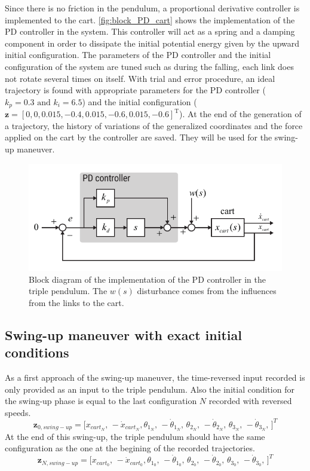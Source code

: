 \documentclass[a4paper,12pt]{article}
\begin{document}
Since there is no friction in the pendulum, a proportional derivative controller is implemented to the cart. \autoref{fig:block_PD_cart} shows the implementation of the PD controller in the system. This controller will act as a spring and a damping component in order to dissipate the initial potential energy given by the upward initial configuration. The parameters of the PD controller and the initial configuration of the system are tuned such as during the falling, each link does not rotate several times on itself. With trial and error procedure, an ideal trajectory is found with appropriate parameters for the PD controller ($k_p=\num{0.3}\text{ and } k_i=\num{6.5}$) and the initial configuration ($\mathbf{z} = [0,0,0.015,\num{-0.4},0.015,\num{-0.6},0.015,\num{-0.6}]^\text{T}$). At the end of the generation of a trajectory, the history of variations of the generalized coordinates and the force applied on the cart by the controller are saved. They will be used for the swing-up maneuver.
\begin{figure}[ht]
	\centering
	\includegraphics[width=15cm]{illustrations/block_PD_cart.pdf}
	\caption{Block diagram of the implementation of the PD controller in the triple pendulum. The $w(s)$ disturbance comes from the influences from the links to the cart.}
	\label{fig:block_PD_cart}
\end{figure}

\subsection{Swing-up maneuver with exact initial conditions}
As a first approach of the swing-up maneuver, the time-reversed input recorded is only provided as an input to the triple pendulum. Also the initial condition for the swing-up phase is equal to the last configuration $N$ recorded with reversed speeds.
\[
\mathbf{z}_{0,swing-up} = \big[ x_{cart_N},\, -\dot x_{cart_N} , \theta_{1_{N}},\, -\dot\theta_{1_{N}},\, \theta_{2_{N}},\, -\dot\theta_{2_{N}},\, \theta_{3_{N}},\, -\dot\theta_{3_{N}},\,  \big]^T
\]
At the end of this swing-up, the triple pendulum should have the same configuration as the one at the begining of the recorded trajectories.
\[
\mathbf{z}_{N,swing-up} = \big[ x_{cart_0},\, -\dot x_{cart_0} , \theta_{1_{0}},\, -\dot\theta_{1_{0}},\, \theta_{2_{0}},\, -\dot\theta_{2_{0}},\, \theta_{3_{0}},\, -\dot\theta_{3_{0}},\,  \big]^T
\]
\end{document}
